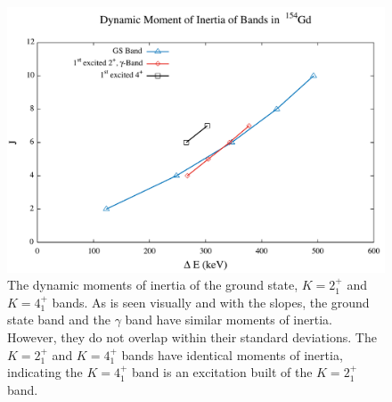 \begin{figure}[!]
    \centering
    \includegraphics[scale=0.45]{Discussion/154_Dynamic.pdf}
    \caption{The dynamic moments of inertia of the ground state, $K=2^+_1$ and $K=4^+_1$ bands. As is seen visually and with the slopes, the ground state band and the $\gamma$ band have similar moments of inertia. However, they do not overlap within their standard deviations. The $K=2^+_1$ and $K=4^+_1$ bands have identical moments of inertia, indicating the $K=4^+_1$ band is an excitation built of the $K=2^+_1$ band.}
    \label{fig:154_Dynamic}
\end{figure}